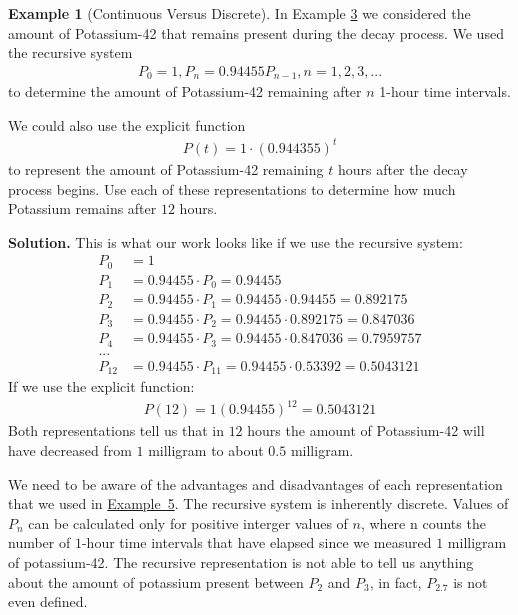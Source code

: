\documentclass[10pt,]{book}
\theoremstyle{plain}
\theoremstyle{definition}
\theoremstyle{definition}
\newtheorem{example}[theorem]{Example}
\theoremstyle{definition}
\numberwithin{equation}{section}
\begin{document}
\begin{example}[Continuous Versus Discrete]\label{example-continuous-discrete}
\hypertarget{p-96}{}%
In Example \hyperref[example-radioactive-decay]{3} we considered the amount of Potassium-42 that remains present during the decay process.  We used the recursive system%
%
\begin{gather*}
P_0=1, P_n=0.94455P_{n-1}, n=1,2,3,...
\end{gather*}
\hypertarget{p-97}{}%
to determine the amount of Potassium-42 remaining after \(n\) 1-hour time intervals.%
\par
\hypertarget{p-98}{}%
We could also use the explicit function%
%
\begin{gather*}
P(t)=1 \cdot (0.944355)^t
\end{gather*}
\hypertarget{p-99}{}%
to represent the amount of Potassium-42 remaining \(t\) hours after the decay process begins. Use each of these representations to determine how much Potassium remains after \(12\) hours.%
\par\smallskip%
\noindent\textbf{Solution.}\hypertarget{solution-8}{}\quad%
\hypertarget{p-100}{}%
This is what our work looks like if we use the recursive system:%
%
\begin{align*}
P_0&=1\\
P_1&=0.94455 \cdot P_0 = 0.94455\\
P_2&=0.94455 \cdot P_1 = 0.94455 \cdot 0.94455 = 0.892175\\
P_3&=0.94455 \cdot P_2 = 0.94455 \cdot 0.892175 = 0.847036\\
P_4&=0.94455 \cdot P_3 = 0.94455 \cdot 0.847036 = 0.7959757\\
...\\
P_{12}&=0.94455 \cdot P_{11} = 0.94455 \cdot 0.53392 = 0.5043121
\end{align*}
\hypertarget{p-101}{}%
If we use the explicit function:%
%
\begin{gather*}
P(12)=1(0.94455)^{12} = 0.5043121
\end{gather*}
\hypertarget{p-102}{}%
Both representations tell us that in \(12\) hours the amount of Potassium-42 will have decreased from \(1\) milligram to about \(0.5\) milligram.%
\par
\hypertarget{p-103}{}%
We need to be aware of the advantages and disadvantages of each representation that we used in \hyperref[example-one-time-bank-desposit]{Example~5}. The recursive system is inherently discrete.  Values of \(P_n\) can be calculated only for positive interger values of \(n\), where n counts the number of \(1\)-hour time intervals that have elapsed since we measured \(1\) milligram of potassium-42. The recursive representation is not able to tell us anything about the amount of potassium present between \(P_2\) and \(P_3\), in fact, \(P_{2.7}\) is not even defined.%

\end{example}
\end{document}
